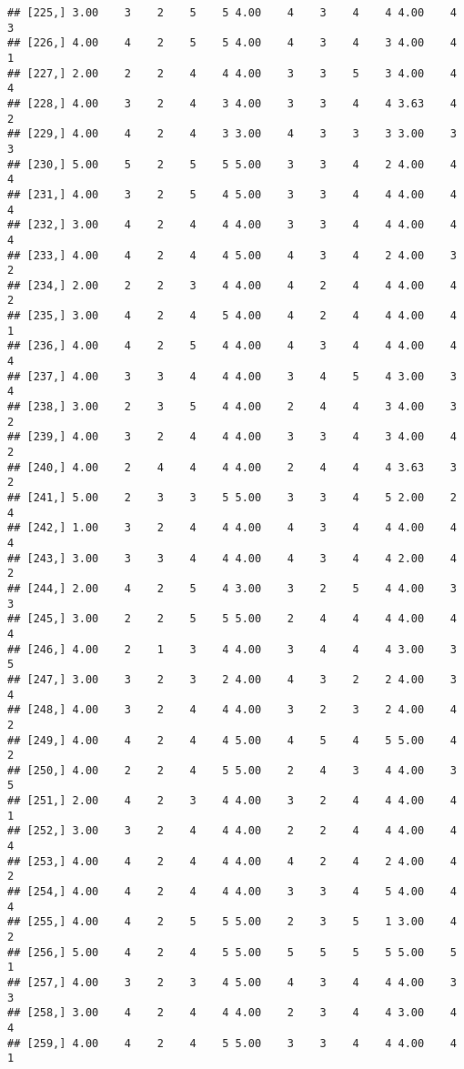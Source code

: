 \documentclass[]{article}
\begin{document}
\begin{verbatim}
## [225,] 3.00    3    2    5    5 4.00    4    3    4    4 4.00    4    3
## [226,] 4.00    4    2    5    5 4.00    4    3    4    3 4.00    4    1
## [227,] 2.00    2    2    4    4 4.00    3    3    5    3 4.00    4    4
## [228,] 4.00    3    2    4    3 4.00    3    3    4    4 3.63    4    2
## [229,] 4.00    4    2    4    3 3.00    4    3    3    3 3.00    3    3
## [230,] 5.00    5    2    5    5 5.00    3    3    4    2 4.00    4    4
## [231,] 4.00    3    2    5    4 5.00    3    3    4    4 4.00    4    4
## [232,] 3.00    4    2    4    4 4.00    3    3    4    4 4.00    4    4
## [233,] 4.00    4    2    4    4 5.00    4    3    4    2 4.00    3    2
## [234,] 2.00    2    2    3    4 4.00    4    2    4    4 4.00    4    2
## [235,] 3.00    4    2    4    5 4.00    4    2    4    4 4.00    4    1
## [236,] 4.00    4    2    5    4 4.00    4    3    4    4 4.00    4    4
## [237,] 4.00    3    3    4    4 4.00    3    4    5    4 3.00    3    4
## [238,] 3.00    2    3    5    4 4.00    2    4    4    3 4.00    3    2
## [239,] 4.00    3    2    4    4 4.00    3    3    4    3 4.00    4    2
## [240,] 4.00    2    4    4    4 4.00    2    4    4    4 3.63    3    2
## [241,] 5.00    2    3    3    5 5.00    3    3    4    5 2.00    2    4
## [242,] 1.00    3    2    4    4 4.00    4    3    4    4 4.00    4    4
## [243,] 3.00    3    3    4    4 4.00    4    3    4    4 2.00    4    2
## [244,] 2.00    4    2    5    4 3.00    3    2    5    4 4.00    3    3
## [245,] 3.00    2    2    5    5 5.00    2    4    4    4 4.00    4    4
## [246,] 4.00    2    1    3    4 4.00    3    4    4    4 3.00    3    5
## [247,] 3.00    3    2    3    2 4.00    4    3    2    2 4.00    3    4
## [248,] 4.00    3    2    4    4 4.00    3    2    3    2 4.00    4    2
## [249,] 4.00    4    2    4    4 5.00    4    5    4    5 5.00    4    2
## [250,] 4.00    2    2    4    5 5.00    2    4    3    4 4.00    3    5
## [251,] 2.00    4    2    3    4 4.00    3    2    4    4 4.00    4    1
## [252,] 3.00    3    2    4    4 4.00    2    2    4    4 4.00    4    4
## [253,] 4.00    4    2    4    4 4.00    4    2    4    2 4.00    4    2
## [254,] 4.00    4    2    4    4 4.00    3    3    4    5 4.00    4    4
## [255,] 4.00    4    2    5    5 5.00    2    3    5    1 3.00    4    2
## [256,] 5.00    4    2    4    5 5.00    5    5    5    5 5.00    5    1
## [257,] 4.00    3    2    3    4 5.00    4    3    4    4 4.00    3    3
## [258,] 3.00    4    2    4    4 4.00    2    3    4    4 3.00    4    4
## [259,] 4.00    4    2    4    5 5.00    3    3    4    4 4.00    4    1

\end{verbatim}
\end{document}

